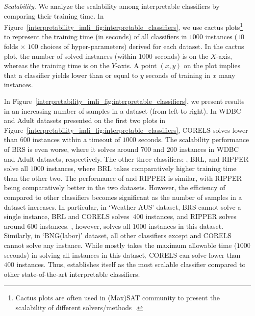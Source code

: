 \textit{Scalability.} We analyze the scalability among interpretable classifiers by comparing their training time. In Figure~\ref{interpretability_imli_fig:interpretable_classifiers}, we use cactus plots\footnote{Cactus plots are often used in (Max)SAT community to present the scalability of different solvers/methods~\cite{argelich2008first,balyo2017sat}.} to represent the training time (in seconds) of all classifiers in $ 1000 $ instances ($ 10 $ folds $ \times  $ $ 100 $ choices of hyper-parameters) derived for each dataset. In the cactus plot, the number of solved instances (within $ 1000 $ seconds) is on the $ X $-axis, whereas the training time is  on the $ Y $-axis. A point $ (x,y) $ on the plot implies that a classifier yields lower than or equal to $ y $ seconds of training in $ x $ many instances. 


In Figure~\ref{interpretability_imli_fig:interpretable_classifiers}, we present results in an increasing number of samples in a dataset (from left to right).
In WDBC and Adult datasets presented on the first two plots in Figure~\ref{interpretability_imli_fig:interpretable_classifiers}, CORELS solves lower than $  600 $ instances within a timeout of $ 1000 $ seconds. The scalability performance of BRS is even worse, where it solves around $ 700 $ and $ 200 $ instances in WDBC and Adult datasets, respectively. The other three classifiers: {\imli}, BRL, and RIPPER  solve all $ 1000 $ instances, where BRL takes comparatively higher training time than the other two. The performance of {\imli} and RIPPER is similar, with RIPPER being comparatively better in the two datasets. However, the efficiency of {\imli} compared to other classifiers becomes significant as the number of samples in a dataset increases. In particular, in `Weather AUS' dataset, BRS cannot solve a single instance, BRL and CORELS solves $ ~400 $ instances, and RIPPER solves around $ 600 $ instances. {\imli}, however, solves all $ 1000 $ instances in this dataset. Similarly, in `BNG(labor)' dataset, all other classifiers except {\imli} and CORELS cannot solve any instance. While {\imli} mostly takes the maximum allowable time ($ 1000 $ seconds) in solving all instances in this dataset, CORELS can solve lower than $ 400 $ instances. 
Thus, {\imli} establishes itself as the most scalable classifier compared to other state-of-the-art interpretable classifiers.


